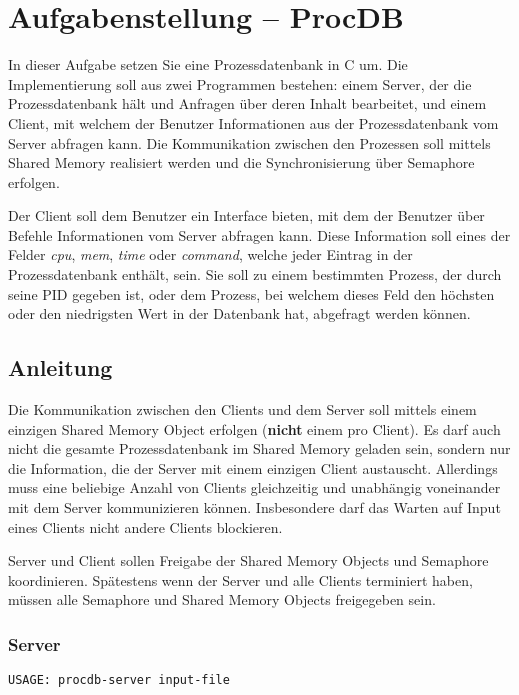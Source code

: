 



\section*{Aufgabenstellung -- ProcDB}

In dieser Aufgabe setzen Sie eine Prozessdatenbank in C um. Die Implementierung
soll aus zwei Programmen bestehen: einem Server, der die Prozessdatenbank hält
und Anfragen über deren Inhalt bearbeitet, und einem Client, mit welchem der
Benutzer Informationen aus der Prozessdatenbank vom Server abfragen kann. Die
Kommunikation zwischen den Prozessen soll mittels Shared Memory realisiert
werden und die Synchronisierung über Semaphore erfolgen.

Der Client soll dem Benutzer ein Interface bieten, mit dem der Benutzer über
Befehle Informationen vom Server abfragen kann. Diese Information soll eines
der Felder \emph{cpu}, \emph{mem}, \emph{time} oder \emph{command}, welche
jeder Eintrag in der Prozessdatenbank enthält, sein. Sie soll zu einem
bestimmten Prozess, der durch seine PID gegeben ist, oder dem Prozess, bei
welchem dieses Feld den höchsten oder den niedrigsten Wert in der Datenbank
hat, abgefragt werden können.

\subsection*{Anleitung}

Die Kommunikation zwischen den Clients und dem Server soll mittels einem
einzigen Shared Memory Object erfolgen (\textbf{nicht} einem pro Client).  Es
darf auch nicht die gesamte Prozessdatenbank im Shared Memory geladen sein,
sondern nur die Information, die der Server mit einem einzigen Client
austauscht.  Allerdings muss eine beliebige Anzahl von Clients gleichzeitig und
unabhängig voneinander mit dem Server kommunizieren können. Insbesondere darf
das Warten auf Input eines Clients nicht andere Clients blockieren.

Server und Client sollen Freigabe der Shared Memory Objects und Semaphore
koordinieren. Spätestens wenn der Server und alle Clients terminiert haben,
müssen alle Semaphore und Shared Memory Objects freigegeben sein.

\subsubsection*{Server}
\begin{verbatim}
USAGE: procdb-server input-file
\end{verbatim}

